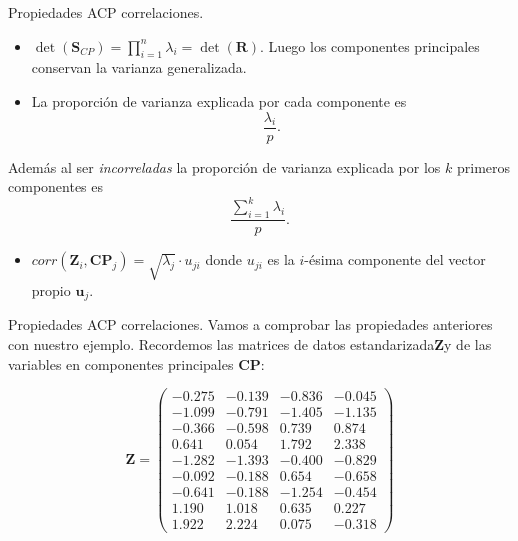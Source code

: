 \documentclass[
  ignorenonframetext,
]{beamer}
\providecommand{\tightlist}{%
  \setlength{\itemsep}{0pt}\setlength{\parskip}{0pt}}
\begin{document}
\begin{frame}{Propiedades ACP correlaciones.}
\protect\hypertarget{propiedades-acp-correlaciones.-3}{}
\begin{itemize}
\item
  \(\det(\mathbf{S}_{CP})=\prod_{i=1}^n \lambda_i =\det(\mathbf{R})\).
  Luego los componentes principales conservan la varianza generalizada.
\item
  La proporción de varianza explicada por cada componente es
  \[\frac{\lambda_i}{p}.\]
\end{itemize}

Además al ser \emph{incorreladas} la proporción de varianza explicada
por los \(k\) primeros componentes es
\[\frac{\sum_{i=1}^k \lambda_i}{p}.\]

\begin{itemize}
\tightlist
\item
  \(corr(\mathbf{Z}_i, \mathbf{CP}_j)=\sqrt{\lambda_j}\cdot u_{j i}\)
  donde \(u_{j i}\) es la \(i\)-ésima componente del vector propio
  \(\mathbf{u}_j\).
\end{itemize}
\end{frame}

\begin{frame}{Propiedades ACP correlaciones.}
\protect\hypertarget{propiedades-acp-correlaciones.-4}{}
Vamos a comprobar las propiedades anteriores con nuestro ejemplo.
Recordemos las matrices de datos estandarizada\(\mathbf{Z}\)y de las
variables en componentes principales \(\mathbf{CP}\):

\[
\mathbf{Z}=
\begin{pmatrix}
-0.275 & -0.139 & -0.836 & -0.045 \\
 -1.099 & -0.791 & -1.405 & -1.135 \\
 -0.366 & -0.598 & 0.739 & 0.874 \\
 0.641 & 0.054 & 1.792 & 2.338 \\
 -1.282 & -1.393 & -0.400 & -0.829 \\
 -0.092 & -0.188 & 0.654 & -0.658 \\
 -0.641 & -0.188 & -1.254 & -0.454 \\
 1.190 & 1.018 & 0.635 & 0.227 \\
 1.922 & 2.224 & 0.075 & -0.318 
\end{pmatrix}
\]
\end{frame}
\end{document}
